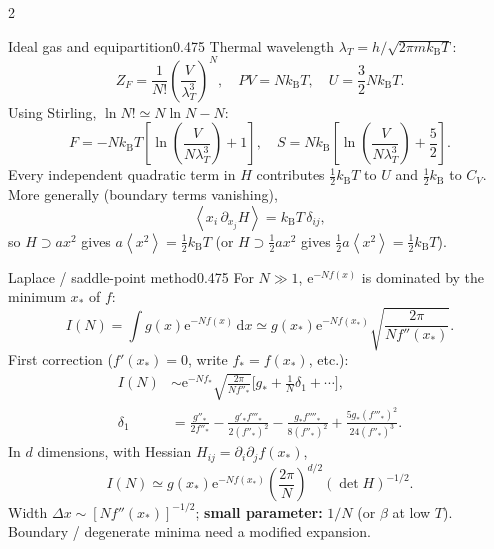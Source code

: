 \documentclass[8pt,a4paper]{extarticle}
\newcommand{\dd}{\,\mathrm d}
\newcommand{\avg}[1]{\left\langle #1\right\rangle}
\newcommand{\e}{\mathrm e}
\newcommand{\kb}{k_{\mathrm B}}
\begin{document}
\begin{multicols*}{2}
\begin{mytikzbox}{Ideal gas and equipartition}{0.475}
Thermal wavelength $\lambda_T=h/\sqrt{2\pi m\kb T}$:
\[
Z_F=\frac1{N!}\left(\frac{V}{\lambda_T^3}\right)^N,
\quad PV=N\kb T,
\quad U=\frac32N\kb T.
\]
Using Stirling, $\ln N!\simeq N\ln N-N$:
\[
F=-N\kb T\left[\ln\left(\frac{V}{N\lambda_T^3}\right)+1\right],
\quad
S=N\kb\left[\ln\left(\frac{V}{N\lambda_T^3}\right)+\frac52\right].
\]
Every independent quadratic term in $H$ contributes $\frac12\kb T$ to
$U$ and $\frac12\kb$ to $C_V$.
More generally (boundary terms vanishing),
\[
\avg{x_i\,\partial_{x_j}H}=\kb T\,\delta_{ij},
\]
so $H\supset ax^2$ gives $a\avg{x^2}=\tfrac12\kb T$
(or $H\supset\tfrac12 a x^2$ gives $\tfrac12 a\avg{x^2}=\tfrac12\kb T$).
\end{mytikzbox}

\begin{mytikzbox}{Laplace / saddle-point method}{0.475}
For $N\gg1$, $\e^{-Nf(x)}$ is dominated by the minimum $x_*$ of $f$:
\[
I(N)=\int g(x)\e^{-Nf(x)}\dd x
\simeq g(x_*)\e^{-Nf(x_*)}
\sqrt{\frac{2\pi}{Nf''(x_*)}}.
\]
First correction ($f'(x_*)=0$, write $f_*=f(x_*)$, etc.):
\[
\begin{aligned}
I(N)&\sim
\e^{-Nf_*}\sqrt{\frac{2\pi}{Nf''_*}}
\bigl[g_*+\tfrac1N\delta_1+\cdots\bigr],\\
\delta_1&=
\frac{g''_*}{2f''_*}
-\frac{g'_*f'''_*}{2(f''_*)^2}
-\frac{g_*f''''_*}{8(f''_*)^2}
+\frac{5g_*(f'''_*)^2}{24(f''_*)^3}.
\end{aligned}
\]
In $d$ dimensions, with Hessian $H_{ij}=\partial_i\partial_jf(x_*)$,
\[
I(N)\simeq g(x_*)\e^{-Nf(x_*)}
\left(\frac{2\pi}{N}\right)^{d/2}(\det H)^{-1/2}.
\]
Width $\Delta x\sim[Nf''(x_*)]^{-1/2}$;
\textbf{small parameter:} $1/N$ (or $\beta$ at low $T$).
Boundary / degenerate minima need a modified expansion.


\end{mytikzbox}
\end{multicols*}
\end{document}
